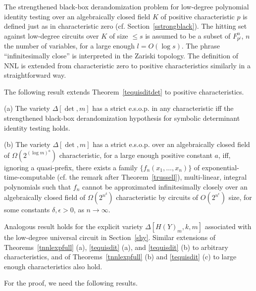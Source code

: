 \documentclass[11pt]{article}
\begin{document}
The strengthened black-box derandomization problem for low-degree polynomial
identity testing over an algebraically closed field $K$ of positive 
characteristic $p$ is defined just as in characteristic zero (cf. Section~\ref{sstrongblack}).
The hitting set against low-degree circuits over $K$ of size $\le s$ 
is assumed to be a subset of $F_{p^l}^n$, $n$ the number of variables, for 
a large enough $l=O(\log s)$. The phrase ``infinitesimally close'' is  
interpreted in the Zariski topology. The definition of NNL 
is  extended from characteristic zero to positive characteristics similarly in a straightforward way.

The following result extends Theorem~\ref{tequisditdet}
to positive characteristics. 

\begin{theorem}  \label{tequisditpos}
\noindent (a) The variety 
$\Delta[\det,m]$ has a strict e.s.o.p. in any characteristic
iff the strengthened black-box derandomization hypothesis for  symbolic determinant identity testing holds.

\noindent (b) The variety 
$\Delta[\det,m]$ has a strict e.s.o.p. over an
algebraically closed field of  $\Omega(2^{(\log m)^a})$ characteristic, 
for a large enough positive constant  $a$, iff, ignoring a quasi-prefix, there exists
a family $\{f_n(x_1,\ldots,x_n)\}$ of 
exponential-time-computable (cf. the remark after Theorem~\ref{trussell}), 
multi-linear, integral 
polynomials such that $f_n$ 
cannot be approximated infinitesimally closely over an algebraically
closed field of $\Omega(2^{n^\delta})$ characteristic 
by circuits   of  
$O(2^{n^\epsilon})$ size,  for some constants $\delta, \epsilon > 0$,
as $n \rightarrow \infty$.
\end{theorem}


Analogous result holds for the explicit variety  $\Delta[H(Y)_m,k,m]$ 
associated with the low-degree universal circuit in Section~\ref{shy}.
Similar extensions of  Theorems~\ref{tnnlexpfull} (a), \ref{tequisdit} (a),
 and \ref{tequisdit} (b) to arbitrary characteristics, 
and of Theorems~\ref{tnnlexpfull} (b) and \ref{tequisdit} (c)
to large enough characteristics also hold.

For the proof, we need the following results.
\end{document}
